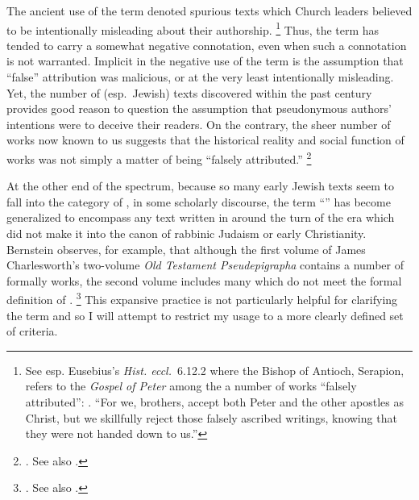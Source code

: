 The ancient use of the term \psa denoted spurious texts which Church leaders believed to be intentionally misleading about their authorship.%
    \footnote{See esp. Eusebius's \emph{Hist. eccl.}~6.12.2 where the Bishop of Antioch, Serapion, refers to the \emph{Gospel of Peter} among the a number of works ``falsely attributed'': . ``For we, brothers, accept both Peter and the other apostles as Christ, but we skillfully reject those falsely ascribed writings, knowing that they were not handed down to us.''}
Thus, the term has tended to carry a somewhat negative connotation, even when such a connotation is not warranted. Implicit in the negative use of the term is the assumption that ``false'' attribution was malicious, or at the very least intentionally misleading. Yet, the number of (esp.~Jewish) \psgraphical texts discovered within the past century provides good reason to question the assumption that pseudonymous authors' intentions were to deceive their readers. On the contrary, the sheer number of \psgraphical works now known to us suggests that the historical reality and social function of \psgraphical works was not simply a matter of being ``falsely attributed.''%
    \footnote{\Cite[53--58]{mroczek2016}. See also \cite{reed_jts2009}.}

At the other end of the spectrum, because so many early Jewish texts seem to fall into the category of \psa, in some scholarly discourse, the term ``\psa'' has become generalized to encompass any text written in around the turn of the era which did not make it into the canon of rabbinic Judaism or early Christianity. Bernstein observes, for example, that although the first volume of James Charlesworth's two-volume \emph{Old Testament Pseudepigrapha} contains a number of formally \psgraphic works, the second volume includes many which do not meet the formal definition of \psa.%
    \footnote{\Cite[2]{bernstein_chazon-etal1999}. See also .}
This expansive practice is not particularly helpful for clarifying the term and so I will attempt to restrict my usage to a more clearly defined set of criteria.


